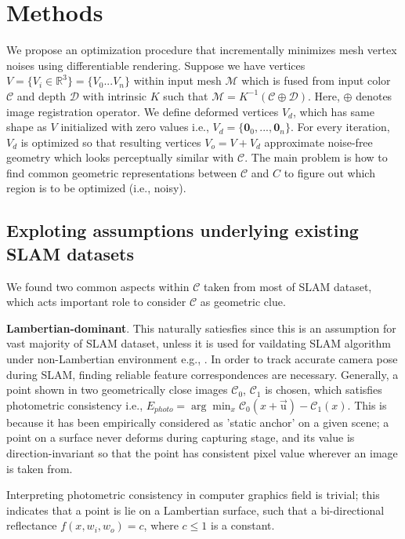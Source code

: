 \section{Methods}

We propose an optimization procedure that incrementally minimizes mesh vertex noises using differentiable rendering. 
Suppose we have vertices $V=\{V_i\in\mathbb{R}^3\}=\{V_0...V_n\}$ within input mesh $\mathcal{M}$ which is fused from input color $\mathcal{C}$ and depth $\mathcal{D}$ with intrinsic $K$ such that $\mathcal{M}=K^{-1}\left(\mathcal{C}\oplus \mathcal{D}\right)$. 
Here, $\oplus$ denotes image registration operator.
We define deformed vertices $V_d$, which has same shape as $V$ initialized with zero values i.e., $V_d=\{\mathbf{0}_0,...,\mathbf{0}_n\}$. 
For every iteration, $V_d$ is optimized so that resulting vertices $V_o=V+V_d$ approximate noise-free geometry which looks perceptually similar with $\mathcal{C}$. 
The main problem is how to find common geometric representations between $\mathcal{C}$ and $C$ to figure out which region is to be optimized (i.e., noisy). 

\subsection{Exploting assumptions underlying existing SLAM datasets}
We found two common aspects within $\mathcal{C}$ taken from most of SLAM dataset, which acts important role to consider $\mathcal{C}$ as geometric clue.

\noindent \textbf{Lambertian-dominant}. 
This naturally satiesfies since this is an assumption for vast majority of SLAM dataset, unless it is used for vaildating SLAM algorithm under non-Lambertian environment e.g., \cite{whelan2018reconstructing}. 
In order to track accurate camera pose during SLAM, finding reliable feature correspondences are necessary.
Generally, a point shown in two geometrically close images $\mathcal{C}_0$, $\mathcal{C}_1$ is chosen, which satisfies photometric consistency i.e., $E_{photo}=\arg\min_x \mathcal{C}_0\left(x+\overrightarrow{\mathrm{u}}\right)-\mathcal{C}_1\left(x\right)$. \cite{szeliski2010computer}
This is because it has been empirically considered as 'static anchor' on a given scene; a point on a surface never deforms during capturing stage, and its value is direction-invariant so that the point has consistent pixel value wherever an image is taken from. 

Interpreting photometric consistency in computer graphics field is trivial; this indicates that a point is lie on a Lambertian surface, such that a bi-directional reflectance $f(x, w_i, w_o)=c$, where $c\le 1$ is a constant.


